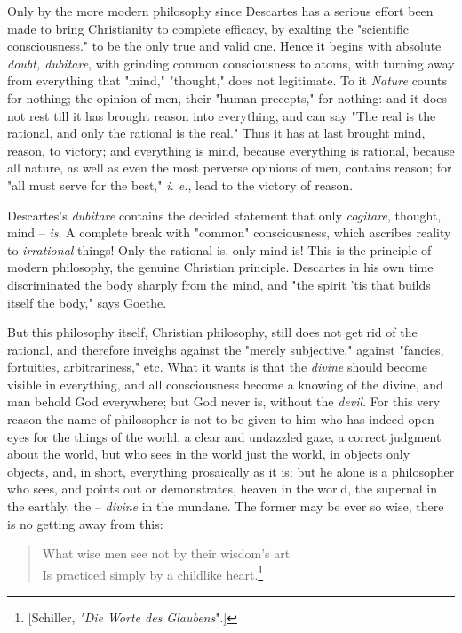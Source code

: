 Only by the more modern philosophy since Descartes has a serious effort been 
made to bring Christianity to complete efficacy, by exalting the "{}scientific 
consciousness."{} to be the only true and valid one. Hence it begins with 
absolute \textit{doubt, dubitare}, with grinding common consciousness to 
atoms, with turning away from everything that "{}mind,"{} "{}thought,"{} does 
not legitimate. To it \textit{Nature} counts for nothing; the opinion of men, 
their "{}human precepts,"{} for nothing: and it does not rest till it has 
brought reason into everything, and can say "{}The real is the rational, and 
only the rational is the real."{} Thus it has at last brought mind, reason, to 
victory; and everything is mind, because everything is rational, because all 
nature, as well as even the most perverse opinions of men, contains reason; 
for "{}all must serve for the best,"{} \textit{i. e.}, lead to the victory of 
reason.

Descartes's \textit{dubitare} contains the decided statement that only 
\textit{cogitare}, thought, mind -- \textit{is}. A complete break with 
"{}common"{} consciousness, which ascribes reality to \textit{irrational} 
things! Only the rational is, only mind is! This is the principle of modern 
philosophy, the genuine Christian principle. Descartes in his own time 
discriminated the body sharply from the mind, and "{}the spirit 'tis that 
builds itself the body,"{} says Goethe.

But this philosophy itself, Christian philosophy, still does not get rid of 
the rational, and therefore inveighs against the "{}merely subjective,"{} 
against "{}fancies, fortuities, arbitrariness,"{} etc. What it wants is that 
the \textit{divine} should become visible in everything, and all consciousness 
become a knowing of the divine, and man behold God everywhere; but God never 
is, without the \textit{devil}. For this very reason the name of philosopher 
is not to be given to him who has indeed open eyes for the things of the 
world, a clear and undazzled gaze, a correct judgment about the world, but who 
sees in the world just the world, in objects only objects, and, in short, 
everything prosaically as it is; but he alone is a philosopher who sees, and 
points out or demonstrates, heaven in the world, the supernal in the earthly, 
the -- \textit{divine} in the mundane. The former may be ever so wise, there 
is no getting away from this:

\begin{quotation}

\noindent{}What wise men see not by their wisdom's art\\
 Is practiced simply by a childlike heart.\footnote{[Schiller, \textit{"{}Die 
Worte des Glaubens}"{}.]}\end{quotation}

